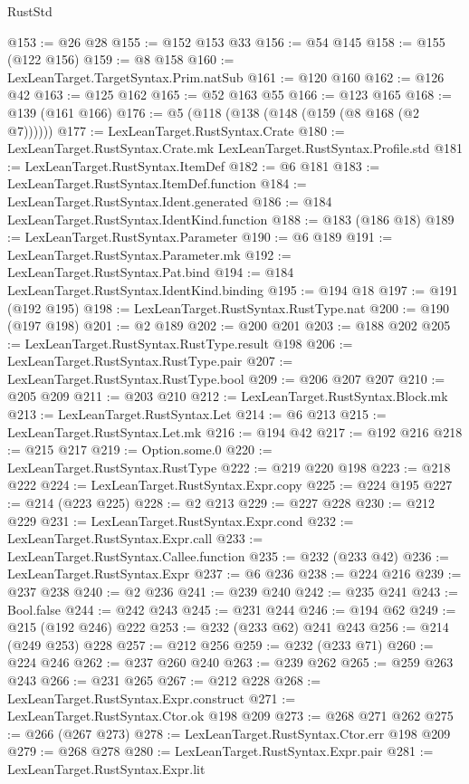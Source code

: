 \begin{lexlean}{RustStd}
\begin{coremodule}
@153 := @26 @28
@155 := @152 @153 @33
@156 := @54 @145
@158 := @155 (@122 @156)
@159 := @8 @158
@160 := LexLeanTarget.TargetSyntax.Prim.natSub
@161 := @120 @160
@162 := @126 @42
@163 := @125 @162
@165 := @52 @163 @55
@166 := @123 @165
@168 := @139 (@161 @166)
@176 := @5 (@118 (@138 (@148 (@159 (@8 @168 (@2 @7))))))
@177 := LexLeanTarget.RustSyntax.Crate
@180 := LexLeanTarget.RustSyntax.Crate.mk LexLeanTarget.RustSyntax.Profile.std
@181 := LexLeanTarget.RustSyntax.ItemDef
@182 := @6 @181
@183 := LexLeanTarget.RustSyntax.ItemDef.function
@184 := LexLeanTarget.RustSyntax.Ident.generated
@186 := @184 LexLeanTarget.RustSyntax.IdentKind.function
@188 := @183 (@186 @18)
@189 := LexLeanTarget.RustSyntax.Parameter
@190 := @6 @189
@191 := LexLeanTarget.RustSyntax.Parameter.mk
@192 := LexLeanTarget.RustSyntax.Pat.bind
@194 := @184 LexLeanTarget.RustSyntax.IdentKind.binding
@195 := @194 @18
@197 := @191 (@192 @195)
@198 := LexLeanTarget.RustSyntax.RustType.nat
@200 := @190 (@197 @198)
@201 := @2 @189
@202 := @200 @201
@203 := @188 @202
@205 := LexLeanTarget.RustSyntax.RustType.result @198
@206 := LexLeanTarget.RustSyntax.RustType.pair
@207 := LexLeanTarget.RustSyntax.RustType.bool
@209 := @206 @207 @207
@210 := @205 @209
@211 := @203 @210
@212 := LexLeanTarget.RustSyntax.Block.mk
@213 := LexLeanTarget.RustSyntax.Let
@214 := @6 @213
@215 := LexLeanTarget.RustSyntax.Let.mk
@216 := @194 @42
@217 := @192 @216
@218 := @215 @217
@219 := Option.some.{0}
@220 := LexLeanTarget.RustSyntax.RustType
@222 := @219 @220 @198
@223 := @218 @222
@224 := LexLeanTarget.RustSyntax.Expr.copy
@225 := @224 @195
@227 := @214 (@223 @225)
@228 := @2 @213
@229 := @227 @228
@230 := @212 @229
@231 := LexLeanTarget.RustSyntax.Expr.cond
@232 := LexLeanTarget.RustSyntax.Expr.call
@233 := LexLeanTarget.RustSyntax.Callee.function
@235 := @232 (@233 @42)
@236 := LexLeanTarget.RustSyntax.Expr
@237 := @6 @236
@238 := @224 @216
@239 := @237 @238
@240 := @2 @236
@241 := @239 @240
@242 := @235 @241
@243 := Bool.false
@244 := @242 @243
@245 := @231 @244
@246 := @194 @62
@249 := @215 (@192 @246) @222
@253 := @232 (@233 @62) @241 @243
@256 := @214 (@249 @253) @228
@257 := @212 @256
@259 := @232 (@233 @71)
@260 := @224 @246
@262 := @237 @260 @240
@263 := @239 @262
@265 := @259 @263 @243
@266 := @231 @265
@267 := @212 @228
@268 := LexLeanTarget.RustSyntax.Expr.construct
@271 := LexLeanTarget.RustSyntax.Ctor.ok @198 @209
@273 := @268 @271 @262
@275 := @266 (@267 @273)
@278 := LexLeanTarget.RustSyntax.Ctor.err @198 @209
@279 := @268 @278
@280 := LexLeanTarget.RustSyntax.Expr.pair
@281 := LexLeanTarget.RustSyntax.Expr.lit

\end{coremodule}
\end{lexlean}
